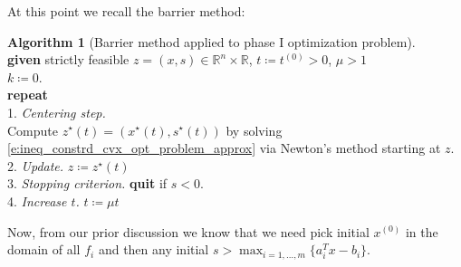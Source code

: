 \documentclass[11pt]{amsart}
\theoremstyle{definition}
\newtheorem{algorithm}{Algorithm}
\theoremstyle{remark}
\newcommand{\ind}{\hspace*{0.5cm}}
\newcommand{\transpose}{T}
\begin{document}
        At this point we recall the barrier method:
        \begin{algorithm}[Barrier method applied to phase I optimization problem]
        \label{a:general_conceptual_cp_alg}\mbox{}\\
            \ind \textbf{given} strictly feasible $z = (x, s) \in \mathbb{R}^n \times \mathbb{R}$, $t \coloneqq t^{(0)} > 0$, $\mu > 1$ \\
            \ind $k \coloneqq 0$. \\
            \ind \textbf{repeat} \\
            \ind\ind 1. \emph{Centering step.} \\
            \ind\ind\ind Compute $z^\star(t) = (x^\star(t), s^\star(t))$ by solving \eqref{e:ineq_constrd_cvx_opt_problem_approx} via Newton's method starting at $z$. \\
            \ind\ind 2. \emph{Update.} $z \coloneqq z^\star(t)$ \\
            \ind\ind 3. \emph{Stopping criterion.} \textbf{quit} if $s < 0$. \\
            \ind\ind 4. \emph{Increase $t$.} $t \coloneqq \mu t$
        \end{algorithm}

        Now, from our prior discussion we know that we need pick initial $x^{(0)}$ in the domain of all $f_i$ and then any initial $s > \max_{i=1, \dots, m}\{a_i^\transpose x - b_i\}$.
\end{document}
